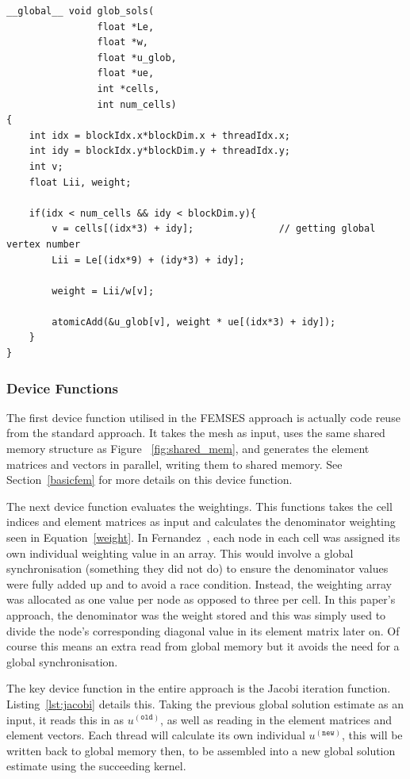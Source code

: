 \begin{lstlisting}[style=cppStyle, caption={Kernel to assemble global solution vector in FEMSES from local solution estimates using weighting.}, label={lst:global}]
__global__ void glob_sols(
                float *Le, 
                float *w, 
                float *u_glob, 
                float *ue, 
                int *cells,
                int num_cells)
{
    int idx = blockIdx.x*blockDim.x + threadIdx.x;
    int idy = blockIdx.y*blockDim.y + threadIdx.y;
    int v;
    float Lii, weight;

    if(idx < num_cells && idy < blockDim.y){
        v = cells[(idx*3) + idy];               // getting global vertex number
        Lii = Le[(idx*9) + (idy*3) + idy];      
        
        weight = Lii/w[v];
        
        atomicAdd(&u_glob[v], weight * ue[(idx*3) + idy]);
    }
}
\end{lstlisting}
\subsubsection{Device Functions}

The first device function utilised in the FEMSES approach is actually code reuse from the standard approach. It takes the mesh as input, uses the same shared memory structure as Figure ~\ref{fig:shared_mem}, and generates the element matrices and vectors in parallel, writing them to shared memory. See Section~\ref{basicfem} for more details on this device function.

The next device function evaluates the weightings. This functions takes the cell indices and element matrices as input and calculates the denominator weighting seen in Equation~\eqref{weight}. In Fernandez~\cite{femses}, each node in each cell was assigned its own individual weighting value in an array. This would involve a global synchronisation (something they did not do) to ensure the denominator values were fully added up and to avoid a race condition. Instead, the weighting array was allocated as one value per node as opposed to three per cell. In this paper's approach, the denominator was the weight stored and this was simply used to divide the node's corresponding diagonal value in its element matrix later on. Of course this means an extra read from global memory but it avoids the need for a global synchronisation.

The key device function in the entire approach is the Jacobi iteration function. Listing~\ref{lst:jacobi} details this. Taking the previous global solution estimate as an input, it reads this in as $u^{(\texttt{old})}$, as well as reading in the element matrices and element vectors. Each thread will calculate its own individual $u^{(\texttt{new})}$, this will be written back to global memory then, to be assembled into a new global solution estimate using the succeeding kernel.

